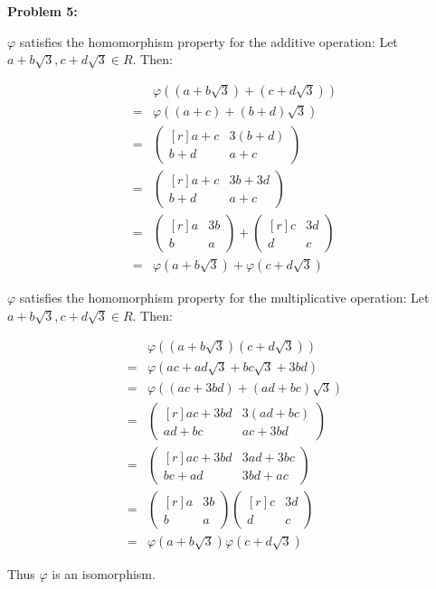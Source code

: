 \documentclass[12pt, letterpaper]{article}
\newenvironment{problem}
    [1]
    {\noindent \textbf{Problem #1:}}
    {\vspace{3mm}}
\begin{document}
\begin{problem}{5}
\begin{enumerate}[(a)]
        \bigskip\noindent
        $\varphi$ satisfies the homomorphism property for the additive operation: Let $a + 
        b\sqrt{3}, c + d\sqrt{3} \in R$. Then:
        
        \begin{align*}
            &\varphi((a + b\sqrt{3}) + (c + d\sqrt{3}))\\
            = &\varphi((a + c) + (b + d)\sqrt{3})\\
            = &\begin{pmatrix*}[r] a + c & 3(b + d) \\ b + d & a + c \end{pmatrix*}\\
            = &\begin{pmatrix*}[r] a + c & 3b + 3d \\ b + d & a + c \end{pmatrix*}\\
            = &\begin{pmatrix*}[r] a & 3b \\ b & a \end{pmatrix*} + 
               \begin{pmatrix*}[r] c & 3d \\ d & c \end{pmatrix*}\\ 
            = &\varphi(a + b\sqrt{3}) + \varphi(c + d\sqrt{3})
        \end{align*}

        $\varphi$ satisfies the homomorphism property for the multiplicative operation: Let $a + 
        b\sqrt{3}, c + d\sqrt{3} \in R$. Then:

        \begin{align*}
            &\varphi((a + b\sqrt{3})(c + d\sqrt{3}))\\
            = &\varphi(ac + ad\sqrt{3} + bc\sqrt{3} + 3bd)\\
            = &\varphi((ac + 3bd) + (ad + bc)\sqrt{3})\\
            = &\begin{pmatrix*}[r] ac + 3bd & 3(ad + bc) \\ ad + bc & ac + 3bd 
               \end{pmatrix*}\\
            = &\begin{pmatrix*}[r] ac + 3bd & 3ad + 3bc \\ bc + ad & 3bd + ac
               \end{pmatrix*}\\
            = &\begin{pmatrix*}[r] a & 3b \\ b & a \end{pmatrix*} 
               \begin{pmatrix*}[r] c & 3d \\ d & c \end{pmatrix*}\\ 
            = &\varphi(a + b\sqrt{3})\varphi(c + d\sqrt{3})
        \end{align*}

        Thus $\varphi$ is an isomorphism.
    \end{enumerate}
\end{problem}
\end{document}
